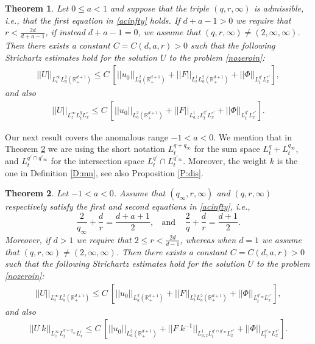 \documentclass[11pt,letter]{amsart}
\def \RN {\mathbb{R}_+^{d+1}}
\numberwithin{equation}{section}
\newtheorem{theorem}{Theorem}[section]
\numberwithin{equation}{section}
\begin{document}
\begin{theorem}\label{T:main}
Let $0\le a<1$ and suppose that the triple $(q,r,\infty)$ is admissible, i.e., that the first equation in \eqref{acinfty} holds. If $d+a-1>0$ we require that $r<\frac{2d}{d+a-1}$, if instead $d+a-1=0$, we assume that $(q,r,\infty)\not= (2,\infty,\infty)$.
 Then there exists a constant $C = C(d,a,r)>0$ such that the following Strichartz estimates hold for the solution $U$ to the problem \eqref{nozeroin}:
\begin{align}\label{Umain}
||U||_{L^\infty_t L^2_a(\RN)} \le C\ \left[||u_0||_{L^2_a(\RN)} + ||F||_{L^1_t L^2_{a}(\RN)} + ||\Phi||_{L^{q'}_t L^{r'}_x} \right],
\end{align}
and also
\begin{align}\label{Umain2}
||U||_{L^\infty_z L^q_t L^r_x } \le C\ \left[||u_0||_{L^2_a(\RN)} +  ||F||_{L^1_{a,z} L^{q'}_t L^{r'}_x } + ||\Phi||_{L^{q'}_t L^{r'}_x} \right].
\end{align}
\end{theorem}

Our next result covers the anomalous range $-1<a<0$.
We mention that in Theorem \ref{T:main2} we are using the short notation $L^{q+q_\infty}_t$ for the sum space $L^{q}_t+L^{q_\infty}_t$, and $L^{q'\cap q'_\infty}_t$ for the intersection space $L^{q'}_t \cap L^{q'_\infty}_t$.
Moreover, the weight $k$ is the one in Definition \ref{D:mn}, see also Proposition \ref{P:dis}. 

\begin{theorem}\label{T:main2}
Let $-1<a<0$. Assume that $(q_\infty,r,\infty)$ and $(q,r,\infty)$ respectively satisfy the first and second equations in \eqref{acinfty}, i.e., 
\begin{equation}\label{uffaa}
\frac{2}{q_\infty} + \frac dr = \frac{d+a+1}2,\ \ \ \ \text{and}\ \ \ \ \ \frac 2{q} + \frac dr = \frac{d+1}2. 
\end{equation} 
Moreover, if $d>1$ we require that $2\le r < \frac{2d}{d-1}$, whereas when $d = 1$ we assume that $(q,r,\infty)\not= (2,\infty,\infty)$.
Then there exists a constant $C = C(d,a,r)>0$ such that the following Strichartz estimates hold for the solution $U$ to the problem \eqref{nozeroin}:
\begin{align}\label{Umain20}
||U||_{L^\infty_t L^2_a(\RN)} \le C\ \left[||u_0||_{L^2_a(\RN)} + ||F||_{L^1_t L^2_{a}(\RN)} + ||\Phi||_{L^{q'_\infty}_t L^{r'}_x} \right],
\end{align}
and also
\begin{align}\label{Umain22}
||U\ k||_{L^\infty_z L^{q+q_\infty}_t L^r_x } \le C\ \left[||u_0||_{L^2_a(\RN)} +  ||F \ k^{-1}||_{L^1_{a,z} L^{q'\cap q'_\infty}_t L^{r'}_x } + ||\Phi||_{L^{q'_\infty}_t L^{r'}_x} \right].
\end{align}
\end{theorem}
\end{document}
